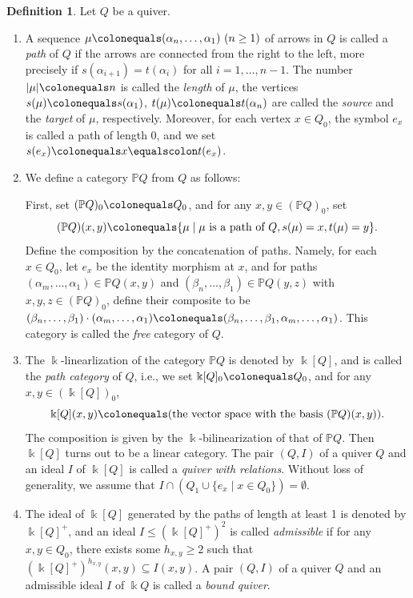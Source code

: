 \documentclass{surv-l}
\numberwithin{equation}{chapter}
\numberwithin{figure}{chapter}
\theoremstyle{plain}
\theoremstyle{definition}
\newtheorem{dfn}[thm]{Definition}
\theoremstyle{remark}
\begin{document}
\begin{dfn}
Let $Q$ be a quiver.
\begin{enumerate}
\item
A sequence $\mu\colonequals (\alpha_n,\dots, \alpha_1)\ (n\ge 1)$ of arrows in $Q$
is called a \emph{path} of $Q$ if the arrows are connected from the right to the left,
more precisely if $s(\alpha_{i+1})=t(\alpha_i)$ for all $i=1,\dots,n-1$.
The number $|\mu|\colonequals n$ is called the \emph{length} of $\mu$,
the vertices $s(\mu)\colonequals s(\alpha_1)$, $t(\mu)\colonequals  t(\alpha_n)$ are called
the \emph{source} and the \emph{target} of $\mu$, respectively.
Moreover, for each vertex
$x \in Q_0$, the symbol $e_x$ is called a path of length 0, and we set
$s(e_x)\colonequals x \equalscolon t(e_x)$.
\item
We define a category $\mathbb{P} Q$ from $Q$ as follows:

First, set $(\mathbb{P} Q)_0\colonequals  Q_0$, and for any $x, y \in (\mathbb{P} Q)_0$, set
\[
(\mathbb{P} Q)(x,y)\colonequals \{\mu \mid \mu \text{ is a path of } Q,  s(\mu)=x, t(\mu) =y\}.
\]
Define the composition by the concatenation of paths.
Namely, for each $x \in Q_0$, let $e_x$ be the identity morphism at $x$,
and for paths $(\alpha_m,\dots, \alpha_1) \in \mathbb{P} Q(x,y)$ and
$(\beta_n,\dots, \beta_1) \in \mathbb{P} Q(y,z)$ with $x, y, z \in (\mathbb{P} Q)_0$,
define their composite to be
$(\beta_n,\dots, \beta_1)\cdot (\alpha_m,\dots, \alpha_1)\colonequals 
(\beta_n,\dots, \beta_1,\alpha_m,\dots, \alpha_1)$.
This category is called the \emph{free} category of $Q$.
\item
The $\Bbbk$-linearlization of the category $\mathbb{P} Q$ is denoted by
$\Bbbk[Q]$, and is called the \emph{path category} of $Q$, i.e.,
we set $\Bbbk[Q]_0\colonequals  Q_0$, and for any $x, y \in (\Bbbk[Q])_0$,
\[
\Bbbk[Q](x,y)\colonequals (\text{the vector space with the basis }(\mathbb{P} Q)(x,y)).
\]
The composition is given by the $\Bbbk$-bilinearization of that of $\mathbb{P} Q$.
Then $\Bbbk[Q]$ turns out to be a linear category.
The pair $(Q, I)$ of a quiver $Q$ and an ideal $I$ of $\Bbbk[Q]$
is called a \emph{quiver with relations}.
Without loss of generality, we assume that
$I \cap (Q_1 \cup \{e_x \mid x \in Q_0\}) = \emptyset$.
\item
The ideal of $\Bbbk[Q]$ generated by the paths of length at least 1 is denoted by
$\Bbbk[Q]^{+}$, and an ideal $I \le (\Bbbk[Q]^+)^{2}$ is called \emph{admissible}
if for any $x, y \in Q_0$, there exists some $h_{x,y} \ge 2$ such that
$(\Bbbk[Q]^+)^{h_{x,y}}(x, y) \subseteq I(x,y)$.
A pair $(Q,I)$ of a quiver $Q$ and an admissible ideal $I$ of $\Bbbk Q$
is called a \emph{bound quiver}.
\end{enumerate}
\end{dfn}
\end{document}
